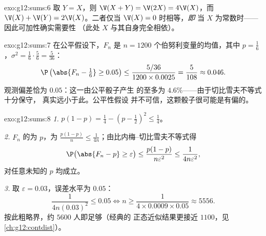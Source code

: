 \begin{solution}{exo:g12:sums:6}
取 $Y = X$，则 $\V(X + Y) = \V(2X) = 4\V(X)$，而
$\V(X) + \V(Y) = 2\V(X)$。二者仅当 $\V(X) = 0$ 时相等，\emph{即}
当 $X$ 为常数时——因此可加性确实需要性
（此处 $X$ 与其自身完全相依）。
\end{solution}

\begin{solution}{exo:g12:sums:7}
在公平假设下，$F_n$ 是 $n = 1200$ 个伯努利变量的均值，其中
$p = \frac16$，$\sigma^2 = \frac16\cdot\frac56 = \frac{5}{36}$：
\[
\P\left(\abs{F_n - \tfrac16} \geq 0.05\right)
\leq \frac{5/36}{1200 \times 0.0025} = \frac{5}{108} \approx 0.046 .
\]
观测偏差恰为 $0.05$：这一由公平骰子产生
的至多为 $4.6\%$——由于切比雪夫不等式十分保守，
真实远小于此。公平性假设
并不可信，这颗骰子很可能是有偏的。
\end{solution}

\begin{solution}{exo:g12:sums:8}
\emph{1.} $p(1-p) = \frac14 - \left(p - \frac12\right)^2 \leq \frac14$。

\emph{2.} $F_n$ 的为 $p$，为
$\frac{p(1-p)}{n} \leq \frac{1}{4n}$；由比内梅--切比雪夫不等式得
\[
\P\bigl(\abs{F_n - p} \geq \varepsilon\bigr)
\leq \frac{p(1-p)}{n\varepsilon^2} \leq \frac{1}{4n\varepsilon^2},
\]
对任意未知的 $p$ 均成立。

\emph{3.} 取 $\varepsilon = 0.03$，误差水平为 $0.05$：
\[
\frac{1}{4n(0.03)^2} \leq 0.05
\iff n \geq \frac{1}{4 \times 0.0009 \times 0.05} \approx 5556 .
\]
按此粗略界，约 $5600$ 人即足够（经典的
正态近似结果更接近 $1100$，见
\cref{ch:g12:contdist}）。
\end{solution}

